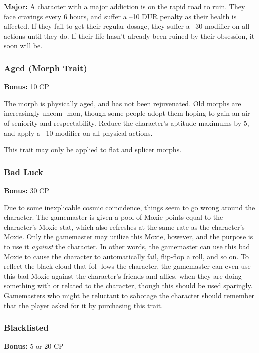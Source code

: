 \textbf{Major:} A character with a major addiction is on 
the rapid road to ruin. They face cravings every 6 
hours, and suffer a –10 DUR penalty as their health 
is affected. If they fail to get their regular dosage, they 
suffer a –30 modifier on all actions until they do. If 
their life hasn't already been ruined by their obsession, 
it soon will be.

\subsubsection{Aged (Morph Trait)}

\textbf{Bonus:} 10 CP

The morph is physically aged, and has not been 
rejuvenated. Old morphs are increasingly uncom-
mon, though some people adopt them hoping to 
gain an air of seniority and respectability. Reduce 
the character's aptitude maximums by 5, and apply 
a –10 modifier on all physical actions.

This trait may only be applied to flat and splicer 
morphs.

\subsubsection{Bad Luck}

\textbf{Bonus:} 30 CP

Due to some inexplicable cosmic coincidence, 
things seem to go wrong around the character. The 
gamemaster is given a pool of Moxie points equal 
to the character's Moxie stat, which also refreshes 
at the same rate as the character's Moxie. Only the 
gamemaster may utilize this Moxie, however, and 
the purpose is to use it \textit{against} the character. In other 
words, the gamemaster can use this bad Moxie to 
cause the character to automatically fail, flip-flop a 
roll, and so on. To reflect the black cloud that fol-
lows the character, the gamemaster can even use this 
bad Moxie against the character's friends and allies, 
when they are doing something with or related to 
the character, though this should be used sparingly. 
Gamemasters who might be reluctant to sabotage the 
character should remember that the player asked for 
it by purchasing this trait.

\subsubsection{Blacklisted}

\textbf{Bonus:} 5 or 20 CP


